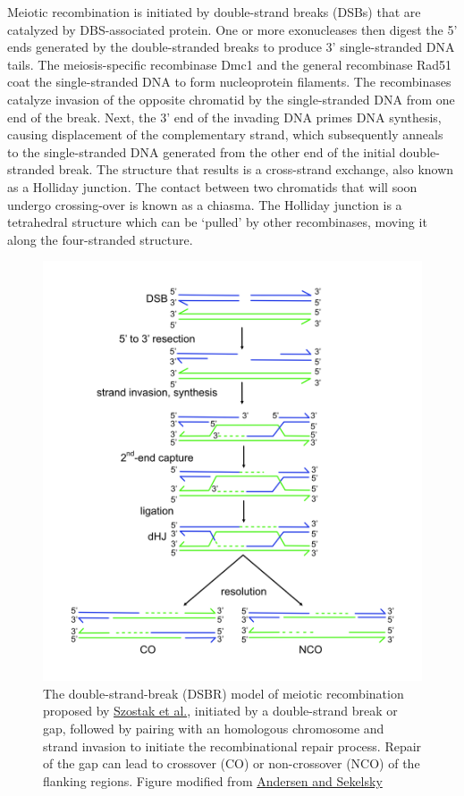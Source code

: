 Meiotic recombination is initiated by double-strand breaks (DSBs) that are catalyzed by DBS-associated protein. One or more exonucleases then digest the 5' ends generated by the double-stranded breaks to produce 3' single-stranded DNA tails. The meiosis-specific recombinase Dmc1 and the general recombinase Rad51 coat the single-stranded DNA to form nucleoprotein filaments. The recombinases catalyze invasion of the opposite chromatid by the single-stranded DNA from one end of the break. Next, the 3' end of the invading DNA primes DNA synthesis, causing displacement of the complementary strand, which subsequently anneals to the single-stranded DNA generated from the other end of the initial double-stranded break. The structure that results is a cross-strand exchange, also known as a Holliday junction. The contact between two chromatids that will soon undergo crossing-over is known as a chiasma. The Holliday junction is a tetrahedral structure which can be `pulled' by other recombinases, moving it along the four-stranded structure.



\begin{figure}

{\centering \includegraphics[width=0.7\linewidth]{./figures/linkage/DSBR_model} 

}

\caption{The double-strand-break (DSBR) model of meiotic recombination proposed by \href{https://www.ncbi.nlm.nih.gov/pubmed/6380756}{Szostak et al.}, initiated by a double-strand break or gap, followed by pairing with an homologous chromosome and strand invasion to initiate the recombinational repair process. Repair of the gap can lead to crossover (CO) or non-crossover (NCO) of the flanking regions. Figure modified from \href{https://www.ncbi.nlm.nih.gov/pubmed/20967781}{Andersen and Sekelsky}}\label{fig:recombination}
\end{figure}

